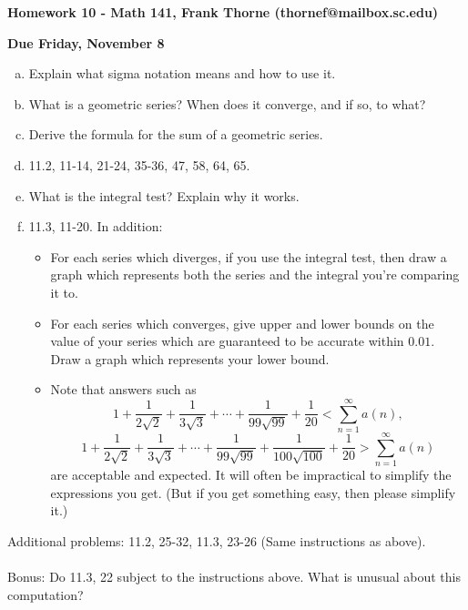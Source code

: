 \documentclass[12pt]{article}
\begin{document}
\setlength{\topmargin}{-2mm}





\begin{center}{\bf Homework 10 - Math 141, Frank Thorne (thornef@mailbox.sc.edu)}
\end{center}
\begin{center}
{\bf Due Friday, November 8}
\end{center}

\begin{enumerate}[(a)]

\item
Explain what sigma notation means and how to use it.

\item
What is a geometric series? When does it converge, and if so, to what?

\item
Derive the formula for the sum of a geometric series.

\item
11.2, 11-14, 21-24, 35-36, 47, 58, 64, 65.

\item
What is the integral test? Explain why it works.

\item
11.3, 11-20. In addition:
\begin{itemize}
\item
For each series which diverges, if you use the integral test, then draw a graph which represents
both the series and the integral you're comparing it to.
\item
For each series which converges, give upper and lower bounds on the value of your series which are
guaranteed to be accurate within $0.01$. Draw a graph which represents your lower bound.
\item
Note that answers such as
\[
1 + \frac{1}{2 \sqrt{2}} + \frac{1}{3 \sqrt{3}} + \cdots + \frac{1}{99 \sqrt{99}} + \frac{1}{20} <
\sum_{n = 1}^{\infty} a(n),
\]
\[
1 + \frac{1}{2 \sqrt{2}} + \frac{1}{3 \sqrt{3}} + \cdots + \frac{1}{99 \sqrt{99}} + \frac{1}{100 \sqrt{100}} +
\frac{1}{20} >
\sum_{n = 1}^{\infty} a(n)
\]
are acceptable and expected. It will often be impractical to simplify the expressions you get. (But if you get
something easy, then please simplify it.)
\end{itemize}

\end{enumerate}
Additional problems:
11.2, 25-32, 11.3, 23-26 (Same instructions as above).
\\
\\
Bonus: Do 11.3, 22 subject to the instructions above. What is unusual about this computation?
\end{document}
